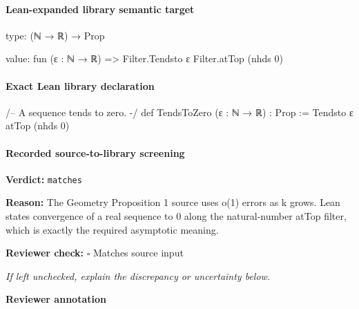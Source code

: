 \documentclass[10pt]{article}
\newcommand{\reviewerbox}{%
  \par\noindent\fbox{\parbox{0.96\linewidth}{\rule{0pt}{0.38in}}}\par
}
\newcommand{\reviewmatch}[1]{%
  \par\noindent\textbf{Reviewer check:} $\square$\; #1\par
  \noindent\emph{If left unchecked, explain the discrepancy or uncertainty below.}\par
}
\begin{document}



\paragraph{Lean-expanded library semantic target}
\begin{ReviewVerbatim}
type:
(ℕ → ℝ) → Prop

value:
fun (ε : ℕ → ℝ) => Filter.Tendsto ε Filter.atTop (nhds 0)
\end{ReviewVerbatim}

\paragraph{Exact Lean library declaration}
\begin{ReviewVerbatim}
/-- A sequence tends to zero. -/
def TendsToZero (ε : ℕ → ℝ) : Prop :=
  Tendsto ε atTop (nhds 0)
\end{ReviewVerbatim}

\paragraph{Recorded source-to-library screening}
\textbf{Verdict:} \texttt{matches}
\\
{\raggedright
\textbf{Reason:} The Geometry Proposition 1 source uses o(1) errors as k grows.\allowbreak{} Lean states convergence of a real sequence to 0 along the natural-\allowbreak{}number atTop filter, which is exactly the required asymptotic meaning.\allowbreak{}
\par}
\reviewmatch{Matches source input}
\noindent\textbf{Reviewer annotation}\par
\reviewerbox
\clearpage
\hypertarget{library-prerequisite-02dcf48d492eec05}{}
\end{document}
